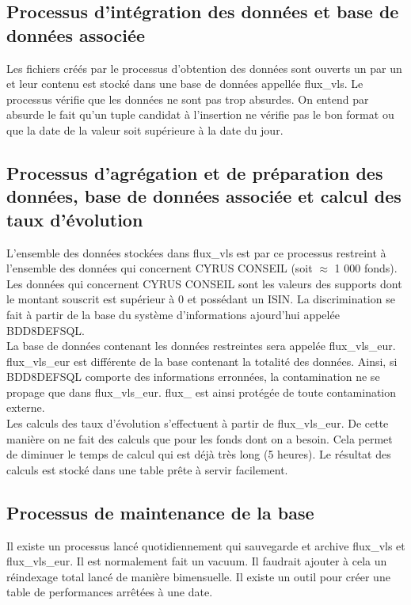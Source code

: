 \subsection{Processus d'intégration des données et base de données associée}
Les fichiers créés par le processus d'obtention des données sont ouverts un par un et leur contenu est stocké dans une base de données appellée flux{\_}vls.
Le processus vérifie que les données ne sont pas trop absurdes.
On entend par absurde le fait qu'un tuple candidat à l'insertion ne vérifie pas le bon format ou que la date de la valeur soit supérieure à la date du jour.

\subsection{Processus d'agrégation et de préparation des données, base de données associée et calcul des taux d'évolution}
L'ensemble des données stockées dans flux{\_}vls est par ce processus restreint à l'ensemble des données qui concernent CYRUS CONSEIL (soit $\approx$ 1 000 fonds). Les données qui concernent CYRUS CONSEIL sont les valeurs des supports dont le montant souscrit est supérieur à 0 et possédant un ISIN. La discrimination se fait à partir de la base du système d'informations ajourd'hui appelée BDD8DEFSQL.\\ 
La base de données contenant les données restreintes sera appelée flux{\_}vls{\_}eur. flux{\_}vls{\_}eur est différente de la base contenant la totalité des données. Ainsi, si BDD8DEFSQL comporte des informations erronnées, la contamination ne se propage que dans flux{\_}vls{\_}eur. flux{\_} est ainsi protégée de toute contamination externe.\\
Les calculs des taux d'évolution s'effectuent à partir de flux{\_}vls{\_}eur. De cette manière on ne fait des calculs que pour les fonds dont on a besoin. Cela permet de diminuer le temps de calcul qui est déjà très long (5 heures). Le résultat des calculs est stocké dans une table prête à servir facilement.

\subsection{Processus de maintenance de la base}
Il existe un processus lancé quotidiennement qui sauvegarde et archive flux{\_}vls et flux{\_}vls{\_}eur. Il est normalement fait un vacuum. Il faudrait ajouter à cela un réindexage total lancé de manière bimensuelle. Il existe un outil pour créer une table de performances arrêtées à une date.
\clearpage
